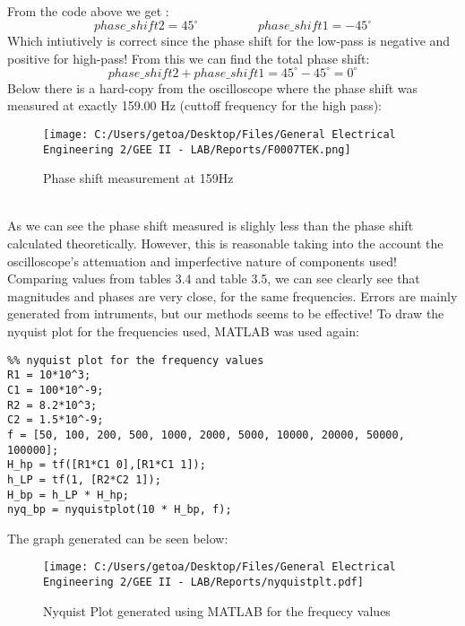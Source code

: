\documentclass[12pt]{report}
\begin{document}
\vspace{-0.1cm}
From the code above we get :
$$phase\_shift2 = 45^\circ \hspace{2cm } phase\_shift1 = -45^\circ $$
Which intiutively is correct since the phase shift for the low-pass is negative and positive for high-pass! From this we can find the total phase shift:
$$ phase\_shift2 +  phase\_shift1 = 45^\circ - 45^\circ  = 0^\circ $$
Below there is a hard-copy from the oscilloscope where the phase shift was measured at exactly 159.00 Hz (cuttoff frequency for the high pass):
\vspace{-0.2cm}
\begin{figure}[!htp]
  \centering
  \texttt{[image: C:/Users/getoa/Desktop/Files/General Electrical Engineering 2/GEE II - LAB/Reports/F0007TEK.png]}
  \caption{Phase shift measurement at 159Hz}
\end{figure}\\
As we can see the phase shift measured is slighly less than the phase shift calculated theoretically. However, this is reasonable taking into the account the oscilloscope's attenuation and imperfective nature of components used! Comparing values from tables 3.4 and table 3.5, we can see clearly see that magnitudes and phases are very close, for the same frequencies. Errors are mainly generated from intruments, but our methods seems to be effective!
\newpage
To draw the nyquist plot for the frequencies used, MATLAB was used again:
\begin{verbatim}
%% nyquist plot for the frequency values
R1 = 10*10^3;
C1 = 100*10^-9;
R2 = 8.2*10^3;
C2 = 1.5*10^-9; 
f = [50, 100, 200, 500, 1000, 2000, 5000, 10000, 20000, 50000, 100000];
H_hp = tf([R1*C1 0],[R1*C1 1]);
h_LP = tf(1, [R2*C2 1]);
H_bp = h_LP * H_hp;
nyq_bp = nyquistplot(10 * H_bp, f);
\end{verbatim}
The graph generated can be seen below:
\begin{figure}[!htp]
  \centering
  \texttt{[image: C:/Users/getoa/Desktop/Files/General Electrical Engineering 2/GEE II - LAB/Reports/nyquistplt.pdf]}
  \caption{Nyquist Plot generated using MATLAB for the frequecy values}
\end{figure}
\end{document}
